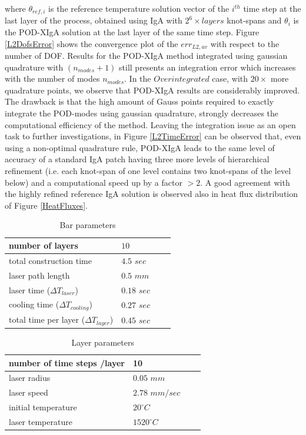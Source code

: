 \documentclass[3p]{article}
\begin{document}
where $\theta_{ref,i}$ is the reference temperature solution vector of the $i^{th}$ time step at the last layer of the process, obtained using IgA with $2^6\times layers$ knot-spans and $\theta_{i}$ is the POD-XIgA solution at the last layer of the same time step. Figure \ref{L2DofsError} shows the convergence plot of the $err_{L2,av}$ with respect to the number of DOF. Results for the POD-XIgA method integrated using gaussian quadrature with $(n_{modes}+1)$ still presents an integration error which increases with the number of modes $n_{modes}$. In the $Overintegrated$ case, with $20\times$ more quadrature points, we observe that POD-XIgA results are considerably improved. The drawback is that the high amount of Gauss points required to exactly integrate the POD-modes using gaussian quadrature, strongly decreases the computational  efficiency of the method. Leaving the integration issue as an open task to further investigations, in Figure \ref{L2TimeError} can be observed that, even using a non-optimal quadrature rule, POD-XIgA leads to the same level of accuracy of a standard IgA patch having three more levels of hierarchical refinement (i.e. each knot-span of one level contains two knot-spans of the level below) and a computational speed up by a factor $>2$.
A good agreement with the highly refined reference IgA solution is observed also in heat flux distribution of Figure \ref{HeatFluxes}. 

\begin{table}[!h]
\centering
    \begin{tabular}{ | l | l | l | p{5cm} |}
    \hline
    number of layers & $10$\\ \hline
    total construction time & $4.5$ $sec$\\ \hline
    laser path length & $0.5$ $mm$\\  \hline
    laser time ($\Delta T_{laser}$) & $0.18$ $sec$\\  \hline
    cooling time ($\Delta T_{cooling}$) & $0.27$ $sec$\\  \hline
    total time per layer ($\Delta T_{layer}$) & $0.45$ $sec$\\  
    \hline
    \end{tabular}
\caption{Bar parameters}
\label{table::processParameters}
\end{table}

\begin{table}[!h]
\centering
    \begin{tabular}{ | l | l | l | p{5cm} |}
    \hline
    number of time steps /layer & 10\\ \hline
    laser radius & $0.05$ ${mm}$\\ \hline
    laser speed & $2.78$ ${mm}/{sec}$\\ \hline
    initial temperature & $20^{\circ}C$\\ \hline
    laser temperature & $1520^{\circ}C$\\ 
    \hline
    \end{tabular}
\caption{Layer parameters}
\label{table::laserParameters}
\end{table}
\end{document}
